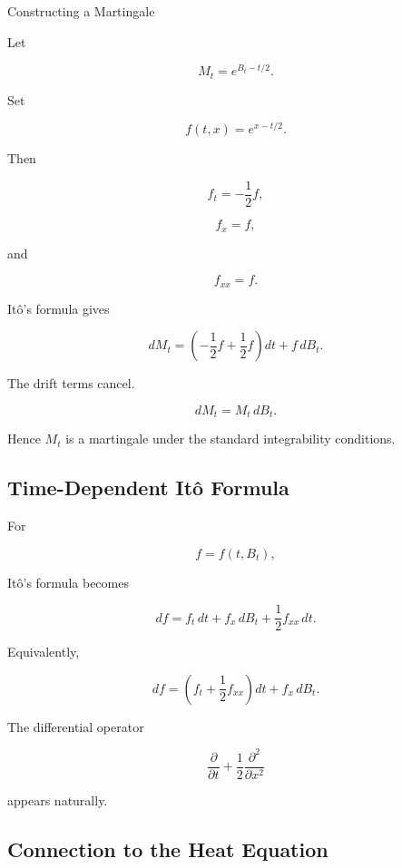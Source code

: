 \begin{workedexamplebox}{Constructing a Martingale}

Let

\[
M_t
=
e^{B_t-t/2}.
\]

Set

\[
f(t,x)
=
e^{x-t/2}.
\]

Then

\[
f_t
=
-\frac12f,
\]

\[
f_x=f,
\]

and

\[
f_{xx}=f.
\]

It\^o's formula gives

\[
dM_t
=
\left(
-\frac12f+\frac12f
\right)dt
+
f\,dB_t.
\]

The drift terms cancel.

\begin{answerbox}
\[
\boxed{
dM_t
=
M_t\,dB_t.
}
\]
\end{answerbox}

Hence \(M_t\) is a martingale under the standard integrability
conditions.

\end{workedexamplebox}

\subsection{Time-Dependent It\^o Formula}
\label{subsec:time-dependent-ito}

For

\[
f=f(t,B_t),
\]

It\^o's formula becomes

\[
\boxed{
df
=
f_t\,dt
+
f_x\,dB_t
+
\frac12f_{xx}\,dt.
}
\]

Equivalently,

\[
\boxed{
df
=
\left(
f_t+\frac12f_{xx}
\right)dt
+
f_x\,dB_t.
}
\]

The differential operator

\[
\boxed{
\frac{\partial}{\partial t}
+
\frac12
\frac{\partial^2}{\partial x^2}
}
\]

appears naturally.

\subsection{Connection to the Heat Equation}
\label{subsec:ito-heat-equation}


